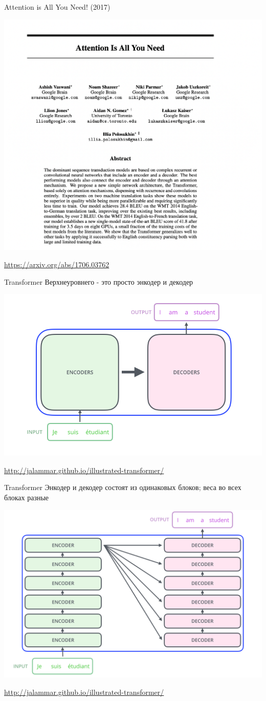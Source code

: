 \documentclass[notes,12pt, aspectratio=169]{beamer}
\begin{document}
\begin{frame}{Attention is All You Need! (2017)} 
	\begin{center}
		\includegraphics[width=.5\linewidth]{att.png}
	\end{center}
	\vfill
	\footnotesize
	{\color{blue} \url{https://arxiv.org/abs/1706.03762}}
\end{frame}


\begin{frame}{Transformer} 
	\alert{Верхнеуровнего - это просто энкодер и декодер}
	
	\begin{center}
		\includegraphics[width=.6\linewidth]{transformer01.png}
	\end{center}
	\vfill
	\footnotesize
	{\color{blue} \url{http://jalammar.github.io/illustrated-transformer/}}
\end{frame}


\begin{frame}{Transformer} 
	Энкодер и декодер состоят из одинаковых блоков; веса во всех блоках разные
	
	\begin{center}
		\includegraphics[width=.6\linewidth]{transformer02.png}
	\end{center}
	\vfill
	\footnotesize
	{\color{blue} \url{http://jalammar.github.io/illustrated-transformer/}}
\end{frame}
\end{document}
